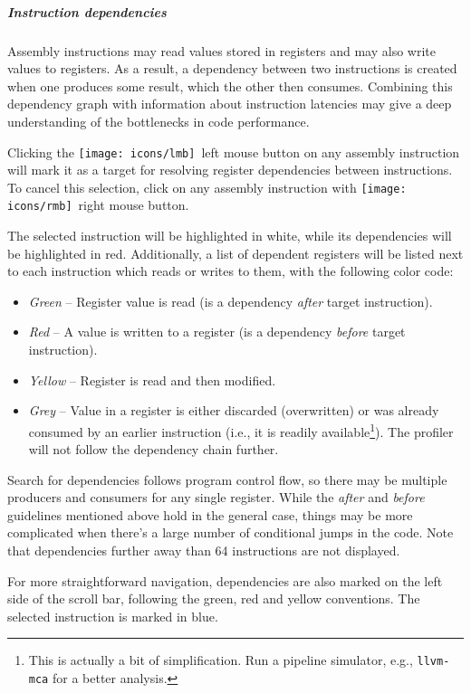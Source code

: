 \documentclass[hidelinks,titlepage,a4paper,twoside]{article}
\newcommand{\LMB}{\texttt{[image: icons/lmb]}}
\newcommand{\RMB}{\texttt{[image: icons/rmb]}}
\begin{document}
\subparagraph{Instruction dependencies}

Assembly instructions may read values stored in registers and may also write values to registers. As a result, a dependency between two instructions is created when one produces some result, which the other then consumes. Combining this dependency graph with information about instruction latencies may give a deep understanding of the bottlenecks in code performance.

Clicking the \LMB{}~left mouse button on any assembly instruction will mark it as a target for resolving register dependencies between instructions. To cancel this selection, click on any assembly instruction with \RMB{}~right mouse button.

The selected instruction will be highlighted in white, while its dependencies will be highlighted in red. Additionally, a list of dependent registers will be listed next to each instruction which reads or writes to them, with the following color code:

\begin{itemize}
\item \emph{Green} -- Register value is read (is a dependency \emph{after} target instruction).
\item \emph{Red} -- A value is written to a register (is a dependency \emph{before} target instruction).
\item \emph{Yellow} -- Register is read and then modified.
\item \emph{Grey} -- Value in a register is either discarded (overwritten) or was already consumed by an earlier instruction (i.e., it is readily available\footnote{This is actually a bit of simplification. Run a pipeline simulator, e.g., \texttt{llvm-mca} for a better analysis.}). The profiler will not follow the dependency chain further.
\end{itemize}

Search for dependencies follows program control flow, so there may be multiple producers and consumers for any single register. While the \emph{after} and \emph{before} guidelines mentioned above hold in the general case, things may be more complicated when there's a large number of conditional jumps in the code. Note that dependencies further away than 64 instructions are not displayed.

For more straightforward navigation, dependencies are also marked on the left side of the scroll bar, following the green, red and yellow conventions. The selected instruction is marked in blue.
\end{document}
